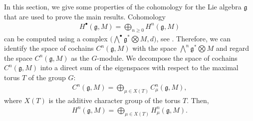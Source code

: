 \documentclass[pdftex]{sigma}%
\numberwithin{equation}{section}
\begin{document}
In this section, we give some properties of the cohomology for the Lie algebra $\mathfrak{g}$ that are used to prove the main results.
Cohomology
\begin{gather*}
H^{\bullet}({\mathfrak{g}},M)=\bigoplus_{n\geq0}H^n({\mathfrak{g}},M)
\end{gather*}
can be computed using a complex $\big(\bigwedge^{\bullet}{\mathfrak{g}}^*\bigotimes M,d\big)$, see \cite[Section~I.9.17]{Jan03}. Therefore, we can identify the space of cochains $C^n({\mathfrak{g}},M)$ with the space $\bigwedge^n{\mathfrak{g}}^*\bigotimes M$ and regard the space $C^n({\mathfrak{g}},M)$ as the $G$-module. We decompose the space of cochains $C^{n}(\mathfrak{g},M)$ into a direct sum
of the eigenspaces with respect to the maximal torus $T$ of the group $G$:
\begin{gather*}
C^{n}({\mathfrak{g}},M)=\bigoplus_{\mu\in
X(T)}C^{n}_{\mu}(\mathfrak{g},M),
\end{gather*}
where $X(T)$ is the additive character group of the torus $T$.
Then,
\begin{gather*}
H^n({\mathfrak{g}},M)=\bigoplus_{\mu\in
X(T)}H^n_{\mu}({\mathfrak{g}},M).
\end{gather*}
\end{document}
